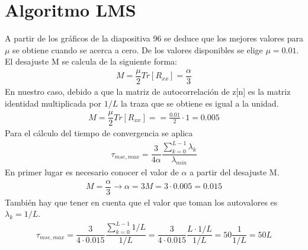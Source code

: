 \documentclass[12pt]{article}
\begin{document}
\section{Algoritmo LMS}
A partir de los gráficos de la diapositiva 96 se deduce que los mejores valores para $\mu$ se obtiene cuando se acerca a cero. De los valores disponibles se elige $\mu = 0.01$.
El desajuste M se calcula de la siguiente forma:
\begin{gather*}
	M=\dfrac{\mu}{2}Tr[ R_{xx}] = \dfrac{\alpha}{3}
\end{gather*}
En nuestro caso, debido a que la matriz de autocorrelación de z[n] es la matriz identidad multiplicada por $1/L$ la traza que se obtiene es igual a la unidad.
\begin{gather*}
	M=\dfrac{\mu}{2}Tr[ R_{xx}] = =\frac{0.01}{2}\cdot 1 = 0.005
\end{gather*}
Para el cálculo del tiempo de convergencia se aplica
\begin{gather*}
	\tau_{mse,max} = \dfrac{3}{4\alpha}\dfrac{\sum_{k=0}^{L-1}\lambda_k}{\lambda_{min}}
\end{gather*}
En primer lugar es necesario conocer el valor de $\alpha$ a partir del desajuste M.
\begin{gather*}
	M=\dfrac{\alpha}{3} \to \alpha = 3M=3\cdot 0.005=0.015
\end{gather*}
También hay que tener en cuenta que el valor que toman los autovalores es $\lambda_k =1/L $.
\begin{gather*}
\tau_{mse,max} = \dfrac{3}{4\cdot 0.015}\dfrac{\sum_{k=0}^{L-1} 1/L}{1/L} = \dfrac{3}{4\cdot 0.015} \dfrac{L\cdot 1/L}{1/L}= 50\dfrac{1}{1/L} =50L
\end{gather*}
\end{document}
